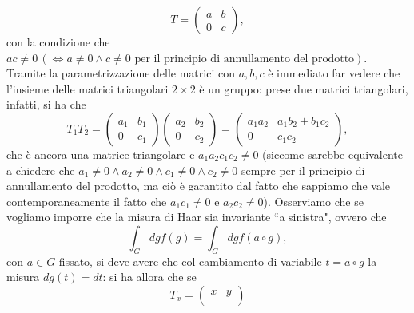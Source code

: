 \begin{example}
\begin{enumerate}[label=\protect\circled{\arabic*}]
            \begin{equation}
                T = \begin{pmatrix}
                    a & b \\
                    0 & c
                \end{pmatrix},
            \end{equation}
            con la condizione che $ac \neq 0 \, (\iff a \neq 0 \wedge c \neq 0 \text{ per il principio di annullamento del prodotto})$. Tramite la parametrizzazione delle matrici con $a, b, c$ è immediato far vedere che l'insieme delle matrici triangolari $2 \times 2$ è un gruppo: prese due matrici triangolari, infatti, si ha che
            \begin{equation}
                T_1 T_2 = \begin{pmatrix}
                    a_1 & b_1 \\
                    0 & c_1
                \end{pmatrix} \begin{pmatrix}
                    a_2 & b_2 \\
                    0 & c_2
                \end{pmatrix} = \begin{pmatrix}
                    a_1 a_2 & a_1 b_2 + b_1 c_2 \\
                    0 & c_1 c_2 
                \end{pmatrix},
            \end{equation}
            che è ancora una matrice triangolare e $a_1 a_2 c_1 c_2 \neq 0$ (siccome sarebbe equivalente a chiedere che $a_1 \neq 0 \wedge a_2 \neq 0 \wedge c_1 \neq 0 \wedge c_2 \neq 0$ sempre per il principio di annullamento del prodotto, ma ciò è garantito dal fatto che sappiamo che vale contemporaneamente il fatto che $a_1 c_1 \neq 0$ e $a_2 c_2 \neq 0$).
            Osserviamo che se vogliamo imporre che la misura di Haar sia invariante ``a sinistra", ovvero che
            \begin{equation}
                \int_G dg f(g) = \int_G dg f(a \circ g), 
            \end{equation}
            con $a \in G$ fissato, si deve avere che col cambiamento di variabile $t = a \circ g$ la misura $dg(t) = dt$: si ha allora che se
            \begin{equation}
                T_x = \begin{pmatrix}
                    x & y \\

\end{pmatrix}
\end{equation}
\end{enumerate}
\end{example}
